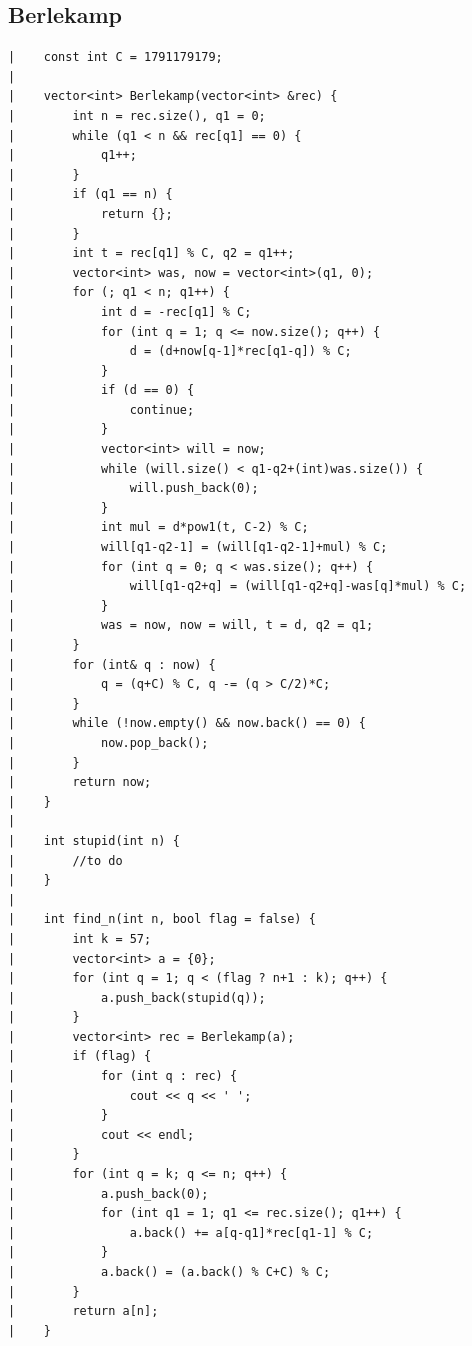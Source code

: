 \documentclass[a4paper, 10pt]{article}
\begin{document}
\begin{center}
\section*{Berlekamp}
\begin{verbatim}
|    const int C = 1791179179;
|    
|    vector<int> Berlekamp(vector<int> &rec) {
|        int n = rec.size(), q1 = 0;
|        while (q1 < n && rec[q1] == 0) {
|            q1++;
|        }
|        if (q1 == n) {
|            return {};
|        }
|        int t = rec[q1] % C, q2 = q1++;
|        vector<int> was, now = vector<int>(q1, 0);
|        for (; q1 < n; q1++) {
|            int d = -rec[q1] % C;
|            for (int q = 1; q <= now.size(); q++) {
|                d = (d+now[q-1]*rec[q1-q]) % C;
|            }
|            if (d == 0) {
|                continue;
|            }
|            vector<int> will = now;
|            while (will.size() < q1-q2+(int)was.size()) {
|                will.push_back(0);
|            }
|            int mul = d*pow1(t, C-2) % C;
|            will[q1-q2-1] = (will[q1-q2-1]+mul) % C;
|            for (int q = 0; q < was.size(); q++) {
|                will[q1-q2+q] = (will[q1-q2+q]-was[q]*mul) % C;
|            }
|            was = now, now = will, t = d, q2 = q1;
|        }
|        for (int& q : now) {
|            q = (q+C) % C, q -= (q > C/2)*C;
|        }
|        while (!now.empty() && now.back() == 0) {
|            now.pop_back();
|        }
|        return now;
|    }
|    
|    int stupid(int n) {
|        //to do
|    }
|    
|    int find_n(int n, bool flag = false) {
|        int k = 57;
|        vector<int> a = {0};
|        for (int q = 1; q < (flag ? n+1 : k); q++) {
|            a.push_back(stupid(q));
|        }
|        vector<int> rec = Berlekamp(a);
|        if (flag) {
|            for (int q : rec) {
|                cout << q << ' ';
|            }
|            cout << endl;
|        }
|        for (int q = k; q <= n; q++) {
|            a.push_back(0);
|            for (int q1 = 1; q1 <= rec.size(); q1++) {
|                a.back() += a[q-q1]*rec[q1-1] % C;
|            }
|            a.back() = (a.back() % C+C) % C;
|        }
|        return a[n];
|    }
\end{verbatim}


\end{center}
\end{document}
